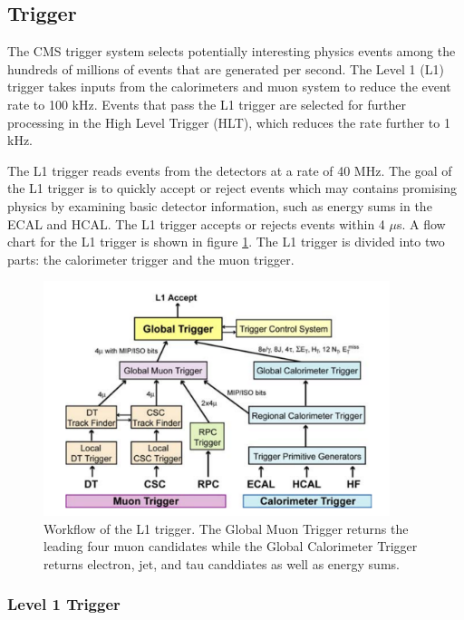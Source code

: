 \documentclass[oneside, letterpaper, oldfontcommands]{memoir}
\begin{document}
\subsection{Trigger}\label{trigger}
\qquad The CMS trigger system selects potentially interesting physics events among the hundreds of millions of events that are generated per second. The Level 1 (L1) trigger takes inputs from the calorimeters and muon system to reduce the event rate to 100 kHz. Events that pass the L1 trigger are selected for further processing in the  High Level Trigger (HLT), which reduces the rate further to 1 kHz.

\qquad The L1 trigger reads events from the detectors at a rate of 40 MHz. The goal of the L1 trigger is to quickly accept or reject events which may contains promising physics by examining basic detector information, such as energy sums in the ECAL and HCAL. The L1 trigger accepts or rejects events within 4 $\mu$s. A flow chart for the L1 trigger is shown in figure \ref{fig:L1Trigger}. The L1 trigger is divided into two parts: the calorimeter trigger and the muon trigger. 

\begin{figure}[here]
\includegraphics[width=0.9\textwidth]{L1trigger.png}
\caption{Workflow of the L1 trigger. The Global Muon Trigger returns the leading four muon candidates while the Global Calorimeter Trigger returns electron, jet, and tau canddiates as well as energy sums.\cite{1748-0221-3-08-S08001}}
\label{fig:L1Trigger}
\end{figure}

\subsubsection{Level 1 Trigger}\label{L1trig}
\end{document}
